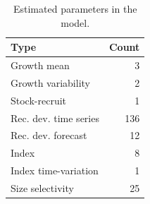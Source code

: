 \documentclass[
  english,
]{article}
\begin{document}
\endgroup

\newpage{}

\begingroup
\fontsize{9.0pt}{11.0pt}\selectfont

\begin{longtable}{lr}

\caption{\label{tbl-n-param}Estimated parameters in the model.}

\tabularnewline

\toprule
Type & Count \\ 
\midrule\addlinespace[2.5pt]
Growth mean & 3 \\ 
Growth variability & 2 \\ 
Stock-recruit & 1 \\ 
Rec. dev. time series & 136 \\ 
Rec. dev. forecast & 12 \\ 
Index & 8 \\ 
Index time-variation & 1 \\ 
Size selectivity & 25 \\ 
\bottomrule

\end{longtable}

\endgroup

\newpage{}
\end{document}
